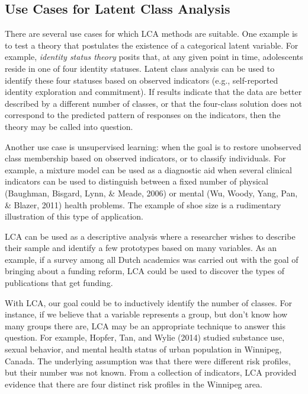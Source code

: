 \documentclass[
  ,man,floatsintext]{apa6}
\begin{document}
\hypertarget{use-cases-for-latent-class-analysis}{%
\subsection{Use Cases for Latent Class Analysis}\label{use-cases-for-latent-class-analysis}}

There are several use cases for which LCA methods are suitable.
One example is to test a theory that postulates the existence of a categorical latent variable.
For example, \emph{identity status theory} posits that, at any given point in time,
adolescents reside in one of four identity statuses.
Latent class analysis can be used to identify these four statuses
based on observed indicators (e.g., self-reported identity exploration and commitment).
If results indicate that the data are better described by a different number of classes,
or that the four-class solution does not correspond to the predicted pattern of responses on the indicators,
then the theory may be called into question.

Another use case is unsupervised learning:
when the goal is to restore unobserved class membership based on observed indicators,
or to classify individuals.
For example, a mixture model can be used as a diagnostic aid
when several clinical indicators can be used to distinguish between
a fixed number of physical (Baughman, Bisgard, Lynn, \& Meade, 2006) or mental (Wu, Woody, Yang, Pan, \& Blazer, 2011) health problems.
The example of shoe size is a rudimentary illustration of this type of application.

LCA can be used as a descriptive analysis
where a researcher wishes to describe their sample
and identify a few prototypes based on many variables.
As an example, if a survey among all Dutch academics was carried out
with the goal of bringing about a funding reform,
LCA could be used to discover the types of publications that get funding.

With LCA, our goal could be to inductively identify the number of classes.
For instance, if we believe that a variable represents a group,
but don't know how many groups there are,
LCA may be an appropriate technique to answer this question.
For example, Hopfer, Tan, and Wylie (2014) studied substance use, sexual behavior,
and mental health status of urban population in Winnipeg, Canada.
The underlying assumption was that there were different risk profiles,
but their number was not known.
From a collection of indicators, LCA provided evidence
that there are four distinct risk profiles in the Winnipeg area.
\end{document}
